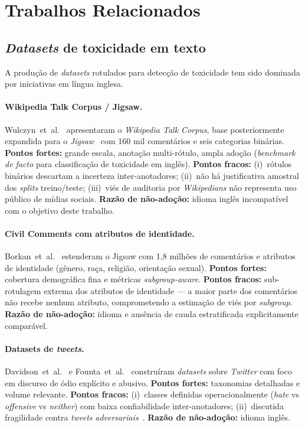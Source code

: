 \section{Trabalhos Relacionados}
\label{sec:related}

\subsection{\textit{Datasets} de toxicidade em texto}

A produção de \textit{datasets} rotulados para detecção de toxicidade tem
sido dominada por iniciativas em língua inglesa.

\paragraph{Wikipedia Talk Corpus / Jigsaw.}
Wulczyn~et~al.~\cite{wulczyn2017} apresentaram o \textit{Wikipedia Talk
Corpus}, base posteriormente expandida para o
\textit{Jigsaw}~\cite{borkan2019nuanced} com 160 mil comentários e seis
categorias binárias.
\textbf{Pontos fortes:} grande escala, anotação multi-rótulo, ampla adoção
(\textit{benchmark} \textit{de facto} para classificação de toxicidade em
inglês). \textbf{Pontos fracos:} (i)~rótulos binários descartam a
incerteza inter-anotadores; (ii)~não há justificativa amostral dos
\textit{splits} treino/teste; (iii)~viés de auditoria por
\textit{Wikipedians} não representa uso público de mídias sociais.
\textbf{Razão de não-adoção:} idioma inglês incompatível com o objetivo
deste trabalho.

\paragraph{Civil Comments com atributos de identidade.}
Borkan~et~al.~\cite{borkan2019nuanced} estenderam o Jigsaw com 1{,}8
milhões de comentários e atributos de identidade (gênero, raça, religião,
orientação sexual). \textbf{Pontos fortes:} cobertura demográfica fina e
métricas \textit{subgroup-aware}. \textbf{Pontos fracos:} sub-rotulagem
extrema dos atributos de identidade --- a maior parte dos comentários não
recebe nenhum atributo, comprometendo a estimação de viés por
\textit{subgroup}. \textbf{Razão de não-adoção:} idioma e ausência de cauda
estratificada explicitamente comparável.

\paragraph{Datasets de \textit{tweets}.}
Davidson~et~al.~\cite{davidson2017} e Founta~et~al.~\cite{founta2018}
construíram \textit{datasets} sobre \textit{Twitter} com foco em discurso de
ódio explícito e abusivo. \textbf{Pontos fortes:} taxonomias detalhadas e
volume relevante. \textbf{Pontos fracos:} (i)~classes definidas operacionalmente
(\textit{hate} vs \textit{offensive} vs \textit{neither}) com baixa
confiabilidade inter-anotadores; (ii)~discutida fragilidade contra
\textit{tweets} \textit{adversariais}~\cite{davidson2017}.
\textbf{Razão de não-adoção:} idioma inglês.

